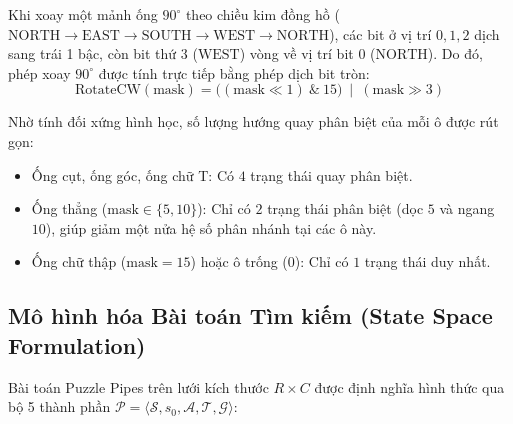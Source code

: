 \documentclass[a4paper]{article}
\begin{document}
Khi xoay một mảnh ống $90^\circ$ theo chiều kim đồng hồ ($\text{NORTH} \to \text{EAST} \to \text{SOUTH} \to \text{WEST} \to \text{NORTH}$), các bit ở vị trí $0, 1, 2$ dịch sang trái 1 bậc, còn bit thứ $3$ ($\text{WEST}$) vòng về vị trí bit $0$ ($\text{NORTH}$). Do đó, phép xoay $90^\circ$ được tính trực tiếp bằng phép dịch bit tròn:
\begin{equation}
    \text{RotateCW}(\text{mask}) = \big((\text{mask} \ll 1) \ \& \ 15\big) \ \mid \ (\text{mask} \gg 3)
\end{equation}

Nhờ tính đối xứng hình học, số lượng hướng quay phân biệt của mỗi ô được rút gọn:
\begin{itemize}
    \item Ống cụt, ống góc, ống chữ T: Có $4$ trạng thái quay phân biệt.
    \item Ống thẳng ($\text{mask} \in \{5, 10\}$): Chỉ có $2$ trạng thái phân biệt (dọc $5$ và ngang $10$), giúp giảm một nửa hệ số phân nhánh tại các ô này.
    \item Ống chữ thập ($\text{mask} = 15$) hoặc ô trống ($0$): Chỉ có $1$ trạng thái duy nhất.
\end{itemize}

\subsection{Mô hình hóa Bài toán Tìm kiếm (State Space Formulation)}
Bài toán Puzzle Pipes trên lưới kích thước $R \times C$ được định nghĩa hình thức qua bộ 5 thành phần $\mathcal{P} = \langle \mathcal{S}, s_0, \mathcal{A}, \mathcal{T}, \mathcal{G} \rangle$:
\end{document}

